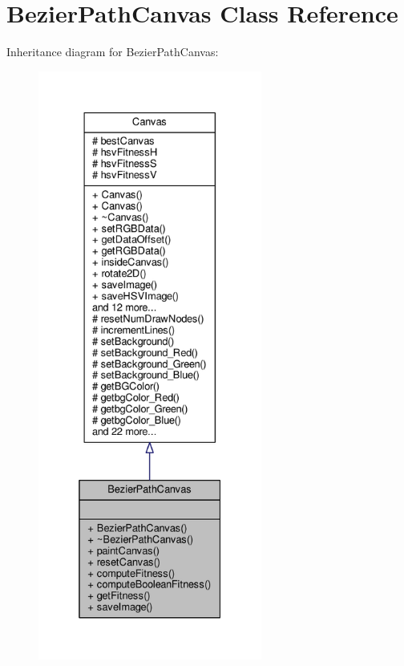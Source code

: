 \hypertarget{classBezierPathCanvas}{}\section{Bezier\+Path\+Canvas Class Reference}
\label{classBezierPathCanvas}


Inheritance diagram for Bezier\+Path\+Canvas\+:
\nopagebreak
\begin{figure}[H]
\begin{center}
\leavevmode
\includegraphics[height=550pt]{classBezierPathCanvas__inherit__graph}
\end{center}
\end{figure}


